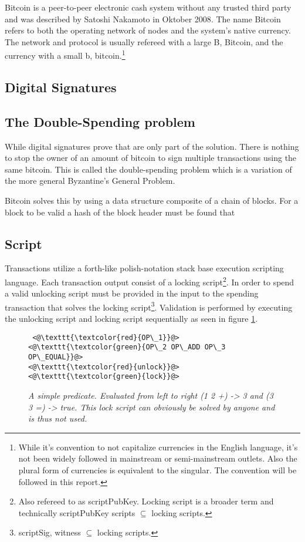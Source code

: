 Bitcoin is a peer-to-peer electronic cash system without any trusted third party and was described by Satoshi Nakamoto in Oktober 2008\cite{nakamoto:bitcoin}. The name Bitcoin refers to both the operating network of nodes and the system's native currency. The network and protocol is usually refereed with a large B, Bitcoin, and the currency with a small b, bitcoin.\footnote{While it's convention to not capitalize currencies in the English language, it's not been widely followed in mainstream or semi-mainstream outlets. Also the plural form of currencies is equivalent to the singular. The convention will be followed in this report.}

\subsection{Digital Signatures}


\subsection{The Double-Spending problem}

While digital signatures prove that are only part of the solution. There is nothing to stop the owner of an amount of bitcoin to sign multiple transactions using the same bitcoin. This is called the double-spending problem which is a variation of the more general Byzantine's General Problem.

Bitcoin solves this by using a data structure composite of a chain of blocks. For a block to be valid a hash of the block header must be found that  

\subsection{Script}

Transactions utilize a forth-like polish-notation stack base execution scripting language\cite{antonopoulos:mastering:bitcoin}. Each transaction output consist of a locking script\footnote{Also refereed to as scriptPubKey. Locking script is a broader term and technically scriptPubKey scripts $ \subseteq $ locking scripts.}. In order to spend a valid unlocking script must be provided in the input to the spending transaction that solves the locking script\footnote{scriptSig, witness $\subseteq $ locking scripts.}. Validation is performed by executing the unlocking script and locking script sequentially as seen in figure \ref{fig:simple:script}. 

\begin{figure}[!hbt]
	
	\begin{lstlisting}
 <@\texttt{\textcolor{red}{OP\_1}}@>   <@\texttt{\textcolor{green}{OP\_2 OP\_ADD OP\_3 OP\_EQUAL}}@>
<@\texttt{\textcolor{red}{unlock}}@>           <@\texttt{\textcolor{green}{lock}}@>
	\end{lstlisting}
	
	\caption{\textit{ A simple predicate. Evaluated from left to right (1 2 +) -> 3 and
			(3 3 =) -> true. This lock script can obviously be solved by anyone and is thus not used.
	}}
	\label{fig:simple:script}
\end{figure}

